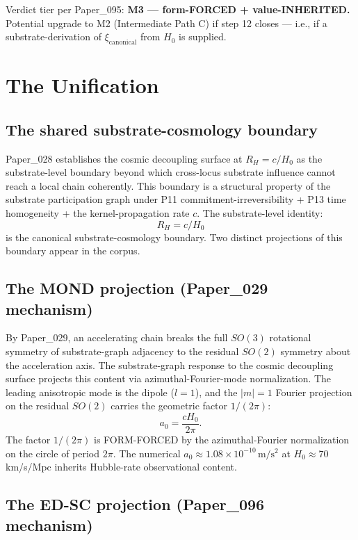 \documentclass[11pt,a4paper]{article}
\begin{document}
Verdict tier per Paper\_095: \textbf{M3 --- form-FORCED + value-INHERITED.} Potential upgrade to M2 (Intermediate Path C) if step 12 closes --- i.e., if a substrate-derivation of $\xi_\mathrm{canonical}$ from $H_0$ is supplied.

\section{The Unification}

\subsection{The shared substrate-cosmology boundary}

Paper\_028 establishes the cosmic decoupling surface at $R_H = c/H_0$ as the substrate-level boundary beyond which cross-locus substrate influence cannot reach a local chain coherently. This boundary is a structural property of the substrate participation graph under P11 commitment-irreversibility + P13 time homogeneity + the kernel-propagation rate $c$. The substrate-level identity:
\[
R_H = c/H_0
\]
is the canonical substrate-cosmology boundary. Two distinct projections of this boundary appear in the corpus.

\subsection{The MOND projection (Paper\_029 mechanism)}

By Paper\_029, an accelerating chain breaks the full $SO(3)$ rotational symmetry of substrate-graph adjacency to the residual $SO(2)$ symmetry about the acceleration axis. The substrate-graph response to the cosmic decoupling surface projects this content via azimuthal-Fourier-mode normalization. The leading anisotropic mode is the dipole ($l=1$), and the $|m|=1$ Fourier projection on the residual $SO(2)$ carries the geometric factor $1/(2\pi)$:
\[
a_0 = \frac{cH_0}{2\pi}.
\]
The factor $1/(2\pi)$ is FORM-FORCED by the azimuthal-Fourier normalization on the circle of period $2\pi$. The numerical $a_0 \approx 1.08 \times 10^{-10}\,\mathrm{m/s^2}$ at $H_0 \approx 70$ km/s/Mpc inherits Hubble-rate observational content.

\subsection{The ED-SC projection (Paper\_096 mechanism)}
\end{document}
